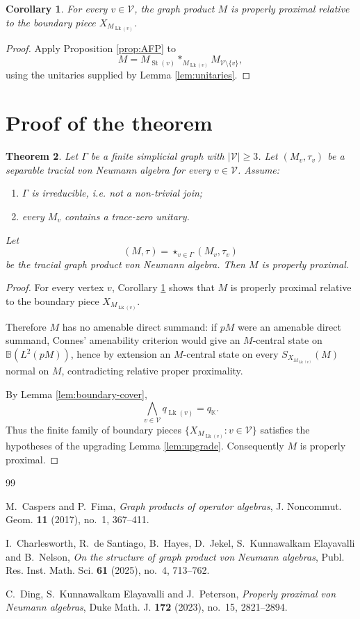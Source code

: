 \documentclass[11pt]{amsart}
\newtheorem{theorem}{Theorem}[section]
\newtheorem{corollary}[theorem]{Corollary}
\theoremstyle{definition}
\newcommand{\V}{\mathcal V}
\newcommand{\Lk}{\operatorname{Lk}}
\newcommand{\St}{\operatorname{St}}
\newcommand{\B}{\mathbb B}
\newcommand{\K}{\mathbb K}
\newcommand{\freeprod}{\mathop{*}}
\begin{document}
\begin{corollary}\label{cor:relative}
For every $v\in\V$, the graph product $M$ is properly proximal relative to the boundary piece $X_{M_{\Lk(v)}}$.
\end{corollary}

\begin{proof}
Apply Proposition \ref{prop:AFP} to
\[
M
=
M_{\St(v)}
\freeprod_{M_{\Lk(v)}}
M_{\V\setminus\{v\}},
\]
using the unitaries supplied by Lemma \ref{lem:unitaries}.
\end{proof}

\section{Proof of the theorem}

\begin{theorem}
Let $\Gamma$ be a finite simplicial graph with $|\V|\geq 3$.  Let $(M_v,\tau_v)$ be a separable tracial von Neumann algebra for every $v\in \V$.  Assume:
\begin{enumerate}[label=(\alph*)]
\item $\Gamma$ is irreducible, i.e. not a non-trivial join;
\item every $M_v$ contains a trace-zero unitary.
\end{enumerate}
Let
\[
(M,\tau)=\mathop{\star}_{v\in\Gamma}(M_v,\tau_v)
\]
be the tracial graph product von Neumann algebra.  Then $M$ is properly proximal.
\end{theorem}

\begin{proof}
For every vertex $v$, Corollary \ref{cor:relative} shows that $M$ is properly proximal relative to the boundary piece $X_{M_{\Lk(v)}}$.

Therefore $M$ has no amenable direct summand: if $pM$ were an amenable direct summand, Connes' amenability criterion would give an $M$-central state on $\B(L^2(pM))$, hence by extension an $M$-central state on every $S_{X_{M_{\Lk(v)}}}(M)$ normal on $M$, contradicting relative proper proximality.

By Lemma \ref{lem:boundary-cover},
\[
\bigwedge_{v\in\V} q_{\Lk(v)}=q_{\K}.
\]
Thus the finite family of boundary pieces $\{X_{M_{\Lk(v)}}:v\in\V\}$ satisfies the hypotheses of the upgrading Lemma \ref{lem:upgrade}.  Consequently $M$ is properly proximal.
\end{proof}

\begin{thebibliography}{99}

M.~Caspers and P.~Fima,
\emph{Graph products of operator algebras},
J. Noncommut. Geom. \textbf{11} (2017), no.~1, 367--411.

I.~Charlesworth, R.~de Santiago, B.~Hayes, D.~Jekel,
S.~Kunnawalkam Elayavalli and B.~Nelson,
\emph{On the structure of graph product von Neumann algebras},
Publ. Res. Inst. Math. Sci. \textbf{61} (2025), no.~4, 713--762.

C.~Ding, S.~Kunnawalkam Elayavalli and J.~Peterson,
\emph{Properly proximal von Neumann algebras},
Duke Math. J. \textbf{172} (2023), no.~15, 2821--2894.

\end{thebibliography}
\end{document}

